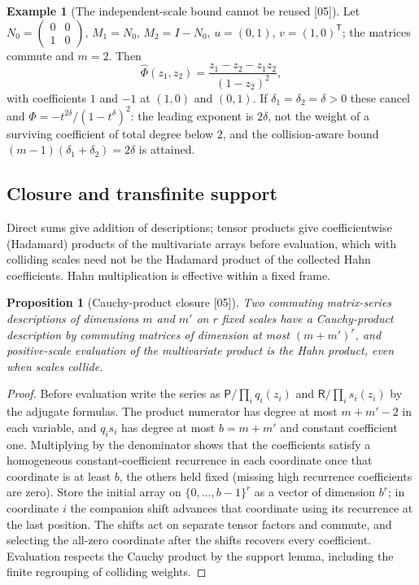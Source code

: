 \documentclass[11pt,oneside]{article}
\numberwithin{equation}{section}
\newtheorem{proposition}[proposition]{Proposition}
\theoremstyle{definition}
\newtheorem{example}[example]{Example}
\theoremstyle{remark}
\newcommand{\src}[1]{\textup{\textsf{\small[#1]}}}
\begin{document}
\begin{example}[The independent-scale bound cannot be reused \src{05}]\label{onot:sh:ex:collision}
Let $N_0=\begin{pmatrix}0&0\\1&0\end{pmatrix}$, $M_1=N_0$, $M_2=I-N_0$, $u=(0,1)$,
$v=(1,0)^{\mathsf T}$; the matrices commute and $m=2$. Then
\[
 \widehat\Phi(z_1,z_2)=\frac{z_1-z_2-z_1z_2}{(1-z_2)^2},
\]
with coefficients $1$ and $-1$ at $(1,0)$ and $(0,1)$. If
$\delta_1=\delta_2=\delta>0$ these cancel and
$\Phi=-t^{2\delta}/(1-t^\delta)^2$: the leading exponent is $2\delta$, not the
weight of a surviving coefficient of total degree below $2$, and the
collision-aware bound $(m-1)(\delta_1+\delta_2)=2\delta$ is attained.
\end{example}

\subsection{Closure and transfinite support}

Direct sums give addition of descriptions; tensor products give coefficientwise
(Hadamard) products of the multivariate arrays before evaluation, which with
colliding scales need not be the Hadamard product of the collected Hahn
coefficients. Hahn multiplication is effective within a fixed frame.

\begin{proposition}[Cauchy-product closure \src{05}]\label{onot:sh:prop:matrixproduct}
Two commuting matrix-series descriptions of dimensions $m$ and $m'$ on $r$ fixed
scales have a Cauchy-product description by commuting matrices of dimension at
most $(m+m')^r$, and positive-scale evaluation of the multivariate product is the
Hahn product, even when scales collide.
\end{proposition}
\begin{proof}
Before evaluation write the series as $\mathsf P/\prod_iq_i(z_i)$ and
$\mathsf R/\prod_is_i(z_i)$ by the adjugate formulas. The product numerator has
degree at most $m+m'-2$ in each variable, and $q_is_i$ has degree at most
$b=m+m'$ and constant coefficient one. Multiplying by the denominator shows that
the coefficients satisfy a homogeneous constant-coefficient recurrence in each
coordinate once that coordinate is at least $b$, the others held fixed (missing
high recurrence coefficients are zero). Store the initial array on
$\{0,\ldots,b-1\}^r$ as a vector of dimension $b^r$; in coordinate $i$ the
companion shift advances that coordinate using its recurrence at the last
position. The shifts act on separate tensor factors and commute, and selecting
the all-zero coordinate after the shifts recovers every coefficient. Evaluation
respects the Cauchy product by the support lemma, including the finite
regrouping of colliding weights.
\end{proof}
\end{document}
